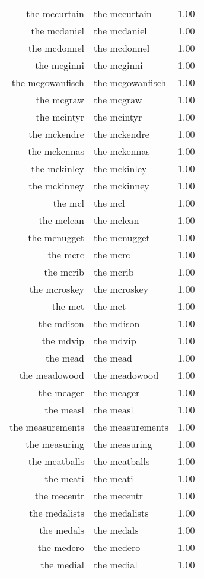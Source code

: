 \begin{table}[ht]
\begin{tabular}{rlr}
  the mccurtain & the mccurtain & 1.00 \\ 
  the mcdaniel & the mcdaniel & 1.00 \\ 
  the mcdonnel & the mcdonnel & 1.00 \\ 
  the mcginni & the mcginni & 1.00 \\ 
  the mcgowanfisch & the mcgowanfisch & 1.00 \\ 
  the mcgraw & the mcgraw & 1.00 \\ 
  the mcintyr & the mcintyr & 1.00 \\ 
  the mckendre & the mckendre & 1.00 \\ 
  the mckennas & the mckennas & 1.00 \\ 
  the mckinley & the mckinley & 1.00 \\ 
  the mckinney & the mckinney & 1.00 \\ 
  the mcl & the mcl & 1.00 \\ 
  the mclean & the mclean & 1.00 \\ 
  the mcnugget & the mcnugget & 1.00 \\ 
  the mcrc & the mcrc & 1.00 \\ 
  the mcrib & the mcrib & 1.00 \\ 
  the mcroskey & the mcroskey & 1.00 \\ 
  the mct & the mct & 1.00 \\ 
  the mdison & the mdison & 1.00 \\ 
  the mdvip & the mdvip & 1.00 \\ 
  the mead & the mead & 1.00 \\ 
  the meadowood & the meadowood & 1.00 \\ 
  the meager & the meager & 1.00 \\ 
  the measl & the measl & 1.00 \\ 
  the measurements & the measurements & 1.00 \\ 
  the measuring & the measuring & 1.00 \\ 
  the meatballs & the meatballs & 1.00 \\ 
  the meati & the meati & 1.00 \\ 
  the mecentr & the mecentr & 1.00 \\ 
  the medalists & the medalists & 1.00 \\ 
  the medals & the medals & 1.00 \\ 
  the medero & the medero & 1.00 \\ 
  the medial & the medial & 1.00 \\ 

\end{tabular}
\end{table}
